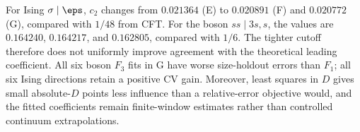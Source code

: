 For Ising $\sigma\mid\eps$, $c_2$ changes from $0.021364$ (E) to
$0.020891$ (F) and $0.020772$ (G), compared with $1/48$ from CFT.
For the boson $ss\mid3s,s$, the values are $0.164240$, $0.164217$,
and $0.162805$, compared with $1/6$. The tighter cutoff therefore does
not uniformly improve agreement with the theoretical leading coefficient.
All six boson $F_3$ fits in G have worse size-holdout errors than $F_1$;
all six Ising directions retain a positive CV gain. Moreover,
least squares in $D$ gives small absolute-$D$ points less influence than
a relative-error objective would, and the fitted coefficients remain
finite-window estimates rather than controlled continuum extrapolations.
